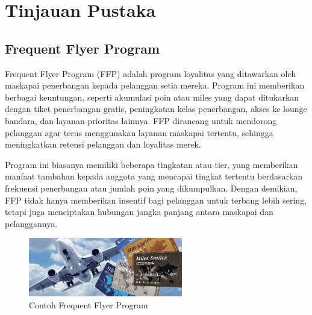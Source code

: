 \newpage
\section{Tinjauan Pustaka}


\subsection{Frequent Flyer Program}
Frequent Flyer Program (FFP) adalah program loyalitas yang ditawarkan oleh maskapai penerbangan kepada pelanggan setia mereka. Program ini memberikan berbagai keuntungan, seperti akumulasi poin atau miles yang dapat ditukarkan dengan tiket penerbangan gratis, peningkatan kelas penerbangan, akses ke lounge bandara, dan layanan prioritas lainnya. FFP dirancang untuk mendorong pelanggan agar terus menggunakan layanan maskapai tertentu, sehingga meningkatkan retensi pelanggan dan loyalitas merek.

Program ini biasanya memiliki beberapa tingkatan atau tier, yang memberikan manfaat tambahan kepada anggota yang mencapai tingkat tertentu berdasarkan frekuensi penerbangan atau jumlah poin yang dikumpulkan. Dengan demikian, FFP tidak hanya memberikan insentif bagi pelanggan untuk terbang lebih sering, tetapi juga menciptakan hubungan jangka panjang antara maskapai dan pelanggannya.

\begin{figure}[H]
    \centering
    \includegraphics[width=0.6\textwidth]{gambar/ffp.jpg}
    \caption{Contoh Frequent Flyer Program}
    \label{fig:ffp}
\end{figure}

